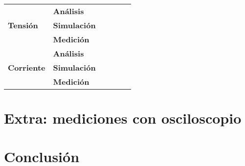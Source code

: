 \begin{enumerate}
\begin{minipage}{\textwidth}
\begin{tabular}{| p{1cm} p{1cm} p{1cm} p{1cm} p{1cm} p{1cm} |}
                \multicolumn{1}{|m{1.4cm}}{\multirow{3}{*}{\centering\textbf{Tensión}}} &
                \multicolumn{1}{m{1.4cm}}{\centering\textbf{Análisis}} &
                \multicolumn{1}{m{.75cm}}{\centering} &
                \multicolumn{1}{m{.75cm}}{\centering} &
                \multicolumn{1}{m{.75cm}}{\centering} &
                \multicolumn{1}{m{.75cm}|}{\centering} \\
                                                      &
                \multicolumn{1}{m{1.4cm}}{\textbf{Simulación}} &
                \multicolumn{1}{m{.75cm}}{\centering} &
                \multicolumn{1}{m{.75cm}}{\centering} &
                \multicolumn{1}{m{.75cm}}{\centering} &
                \multicolumn{1}{m{.75cm}|}{\centering} \\
                                                      &
                \multicolumn{1}{m{1.4cm}}{\centering\textbf{Medición}} &
                \multicolumn{1}{m{.75cm}}{\centering} &
                \multicolumn{1}{m{.75cm}}{\centering} &
                \multicolumn{1}{m{.75cm}}{\centering} &
                \multicolumn{1}{m{.75cm}|}{\centering} \\
                \hline
                \multicolumn{1}{|m{1.4cm}}{\multirow{3}{*}{\centering\textbf{Corriente}}} &
                \multicolumn{1}{m{1.4cm}}{\centering\textbf{Análisis}} &
                \multicolumn{1}{m{.75cm}}{\centering} &
                \multicolumn{1}{m{.75cm}}{\centering} &
                \multicolumn{1}{m{.75cm}}{\centering} &
                \multicolumn{1}{m{.75cm}|}{\centering} \\
                                                      &
                \multicolumn{1}{m{1.4cm}}{\textbf{Simulación}} &
                \multicolumn{1}{m{.75cm}}{\centering} &
                \multicolumn{1}{m{.75cm}}{\centering} &
                \multicolumn{1}{m{.75cm}}{\centering} &
                \multicolumn{1}{m{.75cm}|}{\centering} \\
                                                      &
                \multicolumn{1}{m{1.4cm}}{\centering\textbf{Medición}} &
                \multicolumn{1}{m{.75cm}}{\centering} &
                \multicolumn{1}{m{.75cm}}{\centering} &
                \multicolumn{1}{m{.75cm}}{\centering} &
                \multicolumn{1}{m{.75cm}|}{\centering} \\
                \hline

            \end{tabular}
        \end{minipage}
\end{enumerate}

\section{Extra: mediciones con osciloscopio}

\section{Conclusión}



